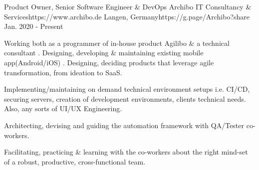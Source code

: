 

\begin{workentries}

\workentry
{Product Owner, Senior Software Engineer \& DevOps} %
{Archibo IT Consultancy \& Services}{https://www.archibo.de} %
{Langen, Germany}{https://g.page/Archibo?share} %
{Jan. 2020 - Present} %
    {
      \begin{workitems} %
        \item {Working both as a programmer of in-house product Agilibo \& a technical consultant
        . Designing, developing \& maintaining existing mobile app(Android/iOS)
        . Designing, deciding products that leverage agile transformation, from ideation to SaaS.}
        \item {Implementing/maintaining on demand technical environment setups i.e. CI/CD, securing servers, creation of development environments,
        clients technical needs. Also, any sorts of UI/UX Engineering.}
        \item {Architecting, devising and guiding the automation framework with QA/Tester co-workers.}
        \item {Facilitating, practicing \& learning with the co-workers about the right mind-set of a robust, productive, cross-functional team.}
      \end{workitems}
    }


\end{workentries}
